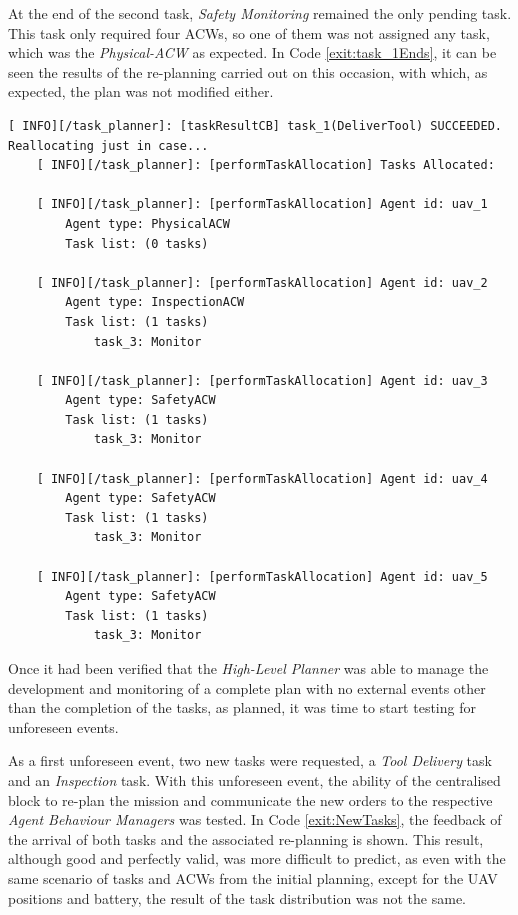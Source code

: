 At the end of the second task, \emph{Safety Monitoring} remained the only pending task. This task only required four \glspl{ACW}, so one of them was not assigned any task, which was the \emph{Physical-ACW} as expected. In Code \ref{exit:task_1Ends}, it can be seen the results of the re-planning carried out on this occasion, with which, as expected, the plan was not modified either.

\begin{lstlisting}[caption={Feedback messages printed after the \emph{Tool Delivery} task ends}, breaklines=true, label=exit:task_1Ends]
    [ INFO][/task_planner]: [taskResultCB] task_1(DeliverTool) SUCCEEDED. Reallocating just in case...
    [ INFO][/task_planner]: [performTaskAllocation] Tasks Allocated:
    
    [ INFO][/task_planner]: [performTaskAllocation] Agent id: uav_1
        Agent type: PhysicalACW
        Task list: (0 tasks)
    
    [ INFO][/task_planner]: [performTaskAllocation] Agent id: uav_2
        Agent type: InspectionACW
        Task list: (1 tasks)
            task_3: Monitor
    
    [ INFO][/task_planner]: [performTaskAllocation] Agent id: uav_3
        Agent type: SafetyACW
        Task list: (1 tasks)
            task_3: Monitor
    
    [ INFO][/task_planner]: [performTaskAllocation] Agent id: uav_4
        Agent type: SafetyACW
        Task list: (1 tasks)
            task_3: Monitor
    
    [ INFO][/task_planner]: [performTaskAllocation] Agent id: uav_5
        Agent type: SafetyACW
        Task list: (1 tasks)
            task_3: Monitor
\end{lstlisting}


Once it had been verified that the \emph{High-Level Planner} was able to manage the development and monitoring of a complete plan with no external events other than the completion of the tasks, as planned, it was time to start testing for unforeseen events.

As a first unforeseen event, two new tasks were requested, a \emph{Tool Delivery} task and an \emph{Inspection} task. With this unforeseen event, the ability of the centralised block to re-plan the mission and communicate the new orders to the respective \emph{Agent Behaviour Managers} was tested. In Code \ref{exit:NewTasks}, the feedback of the arrival of both tasks and the associated re-planning is shown. This result, although good and perfectly valid, was more difficult to predict, as even with the same scenario of tasks and \glspl{ACW} from the initial planning, except for the \gls{UAV} positions and battery, the result of the task distribution was not the same.

